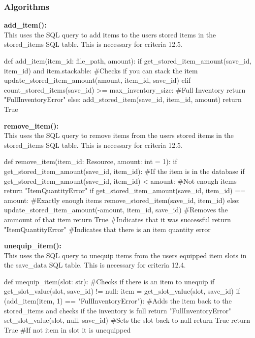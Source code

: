 \documentclass{article}
\begin{document}
        \subsubsection{Algorithms}
        \textbf{add\_item():}\\
        This uses the SQL query to add items to the users stored items in the stored\_items SQL table. This is necessary for criteria 12.5.\\
        \begin{python}
def add_item(item_id: file_path, amount):
   if get_stored_item_amount(save_id, item_id) and item.stackable: #Checks if you can stack the item
      update_stored_item_amount(amount, item_id, save_id)
   elif count_stored_items(save_id) >= max_inventory_size: #Full Inventory
      return "FullInventoryError"
   else:
      add_stored_item(save_id, item_id, amount)
   return True
        \end{python}
        \textbf{remove\_item():}\\
        This uses the SQL query to remove items from the users stored items in the stored\_items SQL table. This is necessary for criteria 12.5.\\
        \begin{python}
def remove_item(item_id: Resource, amount: int = 1):
   if get_stored_item_amount(save_id, item_id): #If the item is in the database
      if get_stored_item_amount(save_id, item_id) < amount: #Not enough items
         return "ItemQuantityError"
      if get_stored_item_amount(save_id, item_id) == amount: #Exactly enough items
         remove_stored_item(save_id, item_id)
      else:
         update_stored_item_amount(-amount, item_id, save_id) #Removes the ammount of that item
      return True #Indicates that it was successful
   return "ItemQuantityError" #Indicates that there is an item quantity error
        
        \end{python}
        \textbf{unequip\_item():}\\
        This uses the SQL query to unequip items from the users equipped item slots in the save\_data SQL table. This is necessary for criteria 12.4.\\
        \begin{python}
def unequip_item(slot: str):
   #Checks if there is an item to unequip
   if get_slot_value(slot, save_id) != null:
      item = get_slot_value(slot, save_id)
      if (add_item(item, 1) == "FullInventoryError"): #Adds the item back to the stored_items and checks if the inventory is full
         return "FullInventoryError"     
      set_slot_value(slot, null, save_id) #Sets the slot back to null
      return True
   return True #If not item in slot it is unequipped
        \end{python}
\end{document}
